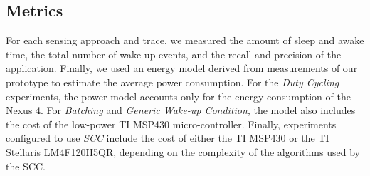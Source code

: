 \subsection{Metrics}

For each sensing approach and trace, we measured the amount of sleep
and awake time, the total number of wake-up events, and the recall and
precision of the application.  Finally, we used an energy model
derived from measurements of our prototype to estimate
the average power consumption.  For the {\em Duty Cycling} experiments, 
the power model accounts only for the energy
consumption of the Nexus 4.  For {\em Batching} and {\em Generic Wake-up Condition},
the model also includes the cost of the low-power TI MSP430
micro-controller.  Finally, experiments configured to use {\em SCC} include the cost of 
either the TI MSP430 or the TI Stellaris
LM4F120H5QR, depending on the complexity of the algorithms used by the SCC.



